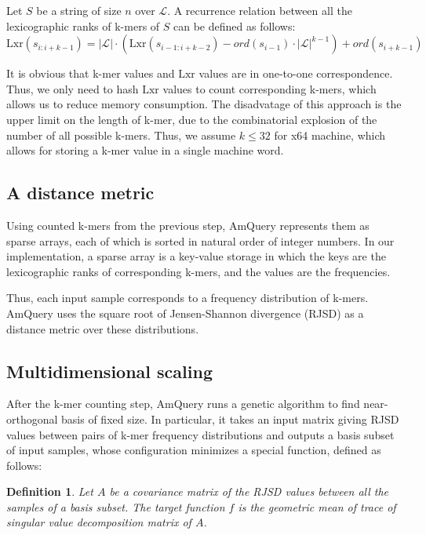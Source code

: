 \documentclass[10pt,letterpaper]{article}
\begin{document}
		\begin{lxr-rolling}
			Let $S$ be a string of size $n$ over ${\mathcal{L}}$. A recurrence relation between all the lexicographic ranks of k-mers of $S$
			can be defined as follows:
			$$\mathrm{Lxr}(s_{i:i+k-1}) = |{\mathcal{L}}| \cdot (\mathrm{Lxr}(s_{i−1:i+k-2}) − ord(s_{i−1}) \cdot 
										 |{\mathcal{L}}|^{k−1}) + ord(s_{i+k−1})$$
		\end{lxr-rolling}

		It is obvious that k-mer values and $\mathrm{Lxr}$ values are in one-to-one
		correspondence. Thus, we only need to hash $\mathrm{Lxr}$ values to count corresponding k-mers,
		which allows us to reduce memory consumption.
		The disadvatage of this approach is the upper limit on the 
		length of k-mer, due to the combinatorial explosion of the number of all possible k-mers.
		Thus, we assume $k \leq 32$ for x64 machine, which allows for storing a k-mer value in a single machine word.

	\subsection*{A distance metric}
	Using counted k-mers from the previous step, AmQuery represents them 
	as sparse arrays, each of which is sorted in natural order of integer 
	numbers. In our implementation, a sparse array is a key-value storage 
	in which the keys are the lexicographic ranks of corresponding k-mers, 
	and the values are the frequencies.
	
	Thus, each input sample corresponds to a frequency distribution of 
	k-mers. AmQuery uses the square root of Jensen-Shannon divergence (RJSD) as 
	a distance metric over these distributions.

	\subsection*{Multidimensional scaling}
	After the k-mer counting step, AmQuery runs a genetic algorithm to find 
	near-orthogonal basis of fixed size.
	In particular, it takes an input matrix giving RJSD values between 
	pairs of k-mer frequency distributions and outputs a basis subset of 
	input samples, whose configuration minimizes a special function, defined 
	as follows:

	\newtheorem{ms-def}[lxr-def]{Definition}
	\begin{ms-def}
		Let $A$ be a covariance matrix of the RJSD values between all
		the samples of a basis subset. The target function $f$ is the geometric 
		mean of trace of singular value decomposition matrix of $A$.
	\end{ms-def}
\end{document}
